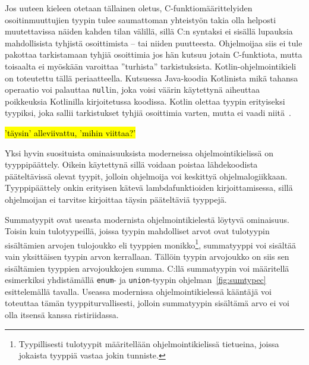 Jos uuteen kieleen otetaan tällainen oletus, C-funktiomäärittelyiden
osoitinmuuttujien tyypin tulee saumattoman yhteistyön takia olla helposti
muutettavissa näiden kahden tilan välillä, sillä C:n syntaksi ei sisällä
lupauksia mahdollisista tyhjistä osoittimista -- tai niiden puutteesta.
Ohjelmoijaa siis ei tule pakottaa tarkistamaan tyhjiä osoittimia jos hän kutsuu
jotain C-funktiota, mutta toisaalta ei myöskään varoittaa ''turhista''
tarkistuksista. Kotlin-ohjelmointikieli~\citep{kotlin} on toteutettu tällä
periaatteella. Kutsuessa Java-koodia Kotlinista mikä tahansa operaatio voi
palauttaa \texttt{null}in, joka voisi väärin käytettynä aiheuttaa poikkeuksia
Kotlinilla kirjoitetussa koodissa. Kotlin olettaa tyypin erityiseksi tyypiksi,
joka sallii tarkistukset tyhjiä osoittimia varten, mutta ei vaadi
niitä~\citep{kotlinnullability}.


\hl{'täysin' alleviivattu, 'mihin viittaa?'}

Yksi hyvin suosituista ominaisuuksista moderneissa ohjelmointikielissä on
tyyppipäättely. Oikein käytettynä sillä voidaan poistaa lähdekoodista
pääteltävissä olevat tyypit, jolloin ohjelmoija voi keskittyä
ohjelmalogiikkaan. Tyyppipäättely onkin erityisen kätevä lambdafunktioiden
kirjoittamisessa, sillä ohjelmoijan ei tarvitse kirjoittaa täysin pääteltäviä
tyyppejä.

Summatyypit ovat useasta modernista
ohjelmointikielestä löytyvä ominaisuus. Toisin kuin
tulotyypeillä, joissa tyypin mahdolliset arvot ovat
tulotyypin sisältämien arvojen tulojoukko eli tyyppien
monikko\footnote{Tyypillisesti tulotyypit määritellään ohjelmointikielissä
tietueina, joissa jokaista tyyppiä vastaa jokin tunniste.},
summatyyppi voi sisältää vain yksittäisen tyypin arvon kerrallaan. Tällöin
tyypin arvojoukko on siis sen sisältämien tyyppien arvojoukkojen summa. C:llä
summatyypin voi määritellä esimerkiksi yhdistämällä \texttt{enum}- ja
\texttt{union}-tyypin ohjelman~\ref{fig:sumtypec} esittelemällä tavalla.
Useassa modernissa ohjelmointikielessä kääntäjä voi toteuttaa tämän
tyyppiturvallisesti, jolloin summatyypin sisältämä arvo ei voi olla itsensä
kanssa ristiriidassa.

